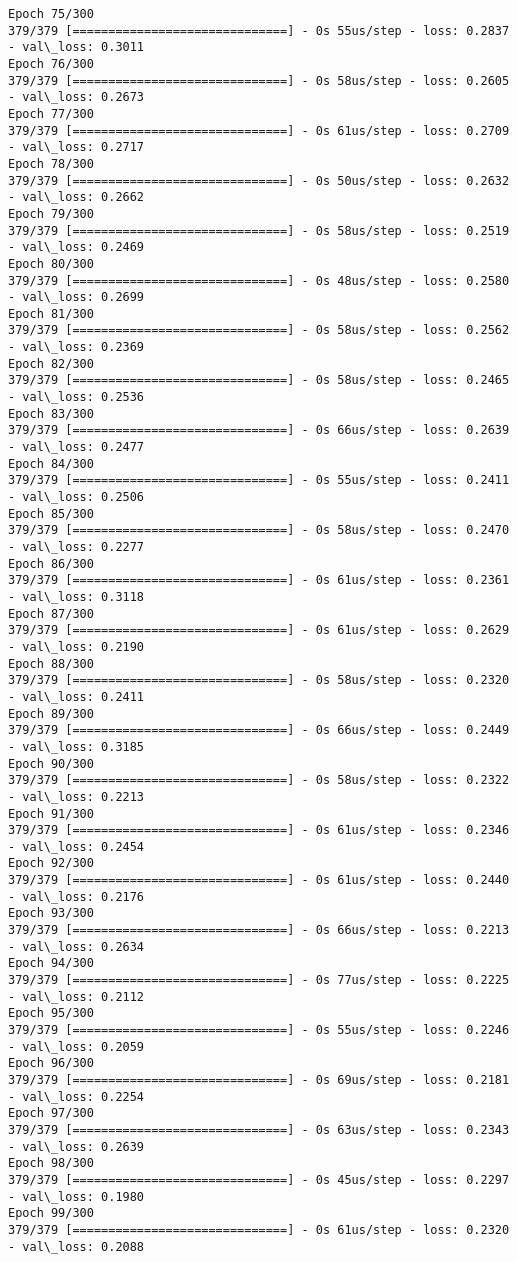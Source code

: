 \documentclass[11pt]{article}
\begin{document}
\begin{Verbatim}[commandchars=\\\{\}]
Epoch 75/300
379/379 [==============================] - 0s 55us/step - loss: 0.2837 - val\_loss: 0.3011
Epoch 76/300
379/379 [==============================] - 0s 58us/step - loss: 0.2605 - val\_loss: 0.2673
Epoch 77/300
379/379 [==============================] - 0s 61us/step - loss: 0.2709 - val\_loss: 0.2717
Epoch 78/300
379/379 [==============================] - 0s 50us/step - loss: 0.2632 - val\_loss: 0.2662
Epoch 79/300
379/379 [==============================] - 0s 58us/step - loss: 0.2519 - val\_loss: 0.2469
Epoch 80/300
379/379 [==============================] - 0s 48us/step - loss: 0.2580 - val\_loss: 0.2699
Epoch 81/300
379/379 [==============================] - 0s 58us/step - loss: 0.2562 - val\_loss: 0.2369
Epoch 82/300
379/379 [==============================] - 0s 58us/step - loss: 0.2465 - val\_loss: 0.2536
Epoch 83/300
379/379 [==============================] - 0s 66us/step - loss: 0.2639 - val\_loss: 0.2477
Epoch 84/300
379/379 [==============================] - 0s 55us/step - loss: 0.2411 - val\_loss: 0.2506
Epoch 85/300
379/379 [==============================] - 0s 58us/step - loss: 0.2470 - val\_loss: 0.2277
Epoch 86/300
379/379 [==============================] - 0s 61us/step - loss: 0.2361 - val\_loss: 0.3118
Epoch 87/300
379/379 [==============================] - 0s 61us/step - loss: 0.2629 - val\_loss: 0.2190
Epoch 88/300
379/379 [==============================] - 0s 58us/step - loss: 0.2320 - val\_loss: 0.2411
Epoch 89/300
379/379 [==============================] - 0s 66us/step - loss: 0.2449 - val\_loss: 0.3185
Epoch 90/300
379/379 [==============================] - 0s 58us/step - loss: 0.2322 - val\_loss: 0.2213
Epoch 91/300
379/379 [==============================] - 0s 61us/step - loss: 0.2346 - val\_loss: 0.2454
Epoch 92/300
379/379 [==============================] - 0s 61us/step - loss: 0.2440 - val\_loss: 0.2176
Epoch 93/300
379/379 [==============================] - 0s 66us/step - loss: 0.2213 - val\_loss: 0.2634
Epoch 94/300
379/379 [==============================] - 0s 77us/step - loss: 0.2225 - val\_loss: 0.2112
Epoch 95/300
379/379 [==============================] - 0s 55us/step - loss: 0.2246 - val\_loss: 0.2059
Epoch 96/300
379/379 [==============================] - 0s 69us/step - loss: 0.2181 - val\_loss: 0.2254
Epoch 97/300
379/379 [==============================] - 0s 63us/step - loss: 0.2343 - val\_loss: 0.2639
Epoch 98/300
379/379 [==============================] - 0s 45us/step - loss: 0.2297 - val\_loss: 0.1980
Epoch 99/300
379/379 [==============================] - 0s 61us/step - loss: 0.2320 - val\_loss: 0.2088

\end{Verbatim}
\end{document}
